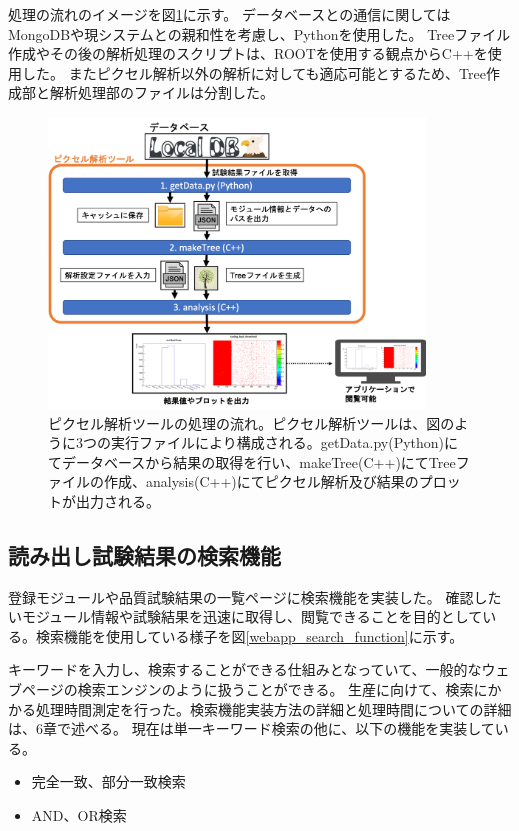 処理の流れのイメージを図\ref{analysis_tool_flow}に示す。
データベースとの通信に関してはMongoDBや現システムとの親和性を考慮し、Pythonを使用した。
Treeファイル作成やその後の解析処理のスクリプトは、ROOTを使用する観点からC++を使用した。
またピクセル解析以外の解析に対しても適応可能とするため、Tree作成部と解析処理部のファイルは分割した。

\begin{figure}[bpt]\centering
\includegraphics[width=10cm]{./analysis_tool_flow.png}
\caption[ピクセル解析ツールの処理の流れ]{ピクセル解析ツールの処理の流れ。ピクセル解析ツールは、図のように3つの実行ファイルにより構成される。getData.py(Python)にてデータベースから結果の取得を行い、makeTree(C++)にてTreeファイルの作成、analysis(C++)にてピクセル解析及び結果のプロットが出力される。}
\label{analysis_tool_flow}
\end{figure}

\clearpage
\subsection{読み出し試験結果の検索機能}
登録モジュールや品質試験結果の一覧ページに検索機能を実装した。
確認したいモジュール情報や試験結果を迅速に取得し、閲覧できることを目的としている。検索機能を使用している様子を図\ref{webapp_search_function}に示す。

キーワードを入力し、検索することができる仕組みとなっていて、一般的なウェブページの検索エンジンのように扱うことができる。
生産に向けて、検索にかかる処理時間測定を行った。検索機能実装方法の詳細と処理時間についての詳細は、6章で述べる。
現在は単一キーワード検索の他に、以下の機能を実装している。
\begin{itemize}
  \item 完全一致、部分一致検索
  \item AND、OR検索
\end{itemize}


